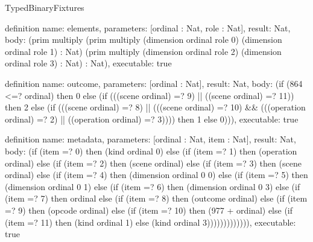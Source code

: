 \begin{lexlean}{TypedBinaryFixtures}
\begin{semanticmodule}
definition{
  name: elements,
  parameters: [ordinal : Nat, role : Nat],
  result: Nat,
  body: (prim multiply (prim multiply (dimension ordinal role 0) (dimension ordinal role 1) : Nat) (prim multiply (dimension ordinal role 2) (dimension ordinal role 3) : Nat) : Nat),
  executable: true
}

definition{
  name: outcome,
  parameters: [ordinal : Nat],
  result: Nat,
  body: (if (864 <=? ordinal) then 0 else (if (((scene ordinal) =? 9) || ((scene ordinal) =? 11)) then 2 else (if (((scene ordinal) =? 8) || (((scene ordinal) =? 10) && (((operation ordinal) =? 2) || ((operation ordinal) =? 3)))) then 1 else 0))),
  executable: true
}

definition{
  name: metadata,
  parameters: [ordinal : Nat, item : Nat],
  result: Nat,
  body: (if (item =? 0) then (kind ordinal 0) else (if (item =? 1) then (operation ordinal) else (if (item =? 2) then (scene ordinal) else (if (item =? 3) then (scene ordinal) else (if (item =? 4) then (dimension ordinal 0 0) else (if (item =? 5) then (dimension ordinal 0 1) else (if (item =? 6) then (dimension ordinal 0 3) else (if (item =? 7) then ordinal else (if (item =? 8) then (outcome ordinal) else (if (item =? 9) then (opcode ordinal) else (if (item =? 10) then (977 + ordinal) else (if (item =? 11) then (kind ordinal 1) else (kind ordinal 3))))))))))))),
  executable: true
}


\end{semanticmodule}
\end{lexlean}
